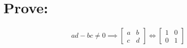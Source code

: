 \documentclass[a4paper, 12pt]{article}
\newcommand{\?}{\stackrel{?}{=}}
\newcommand{\eq}[1]{\begin{align*}#1\end{align*}}
\begin{document}
\section{Prove:}
\eq{
    ad-bc\neq{0} \implies
    \begin{bmatrix}
        a&b\\
        c&d
    \end{bmatrix}
    \iff
    \begin{bmatrix}
        1&0\\
        0&1
    \end{bmatrix}
}



\end{document}
